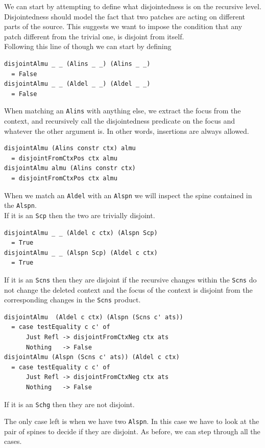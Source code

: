 \documentclass[11pt, titlepage]{article}
\newcommand{\toHaskell}[1]{\texttt{#1}\xspace}
\newcommand{\alins}{\toHaskell{Alins}}
\newcommand{\aldel}{\toHaskell{Aldel}}
\newcommand{\alspn}{\toHaskell{Alspn}}
\newcommand{\scp}{\toHaskell{Scp}}
\newcommand{\scns}{\toHaskell{Scns}}
\newcommand{\schg}{\toHaskell{Schg}}
\begin{document}
We can start by attempting to define what disjointedness is on the recursive 
level.  Disjointedness should model the fact that two patches are acting on different parts of the source. This suggests we want to impose the condition that any patch different from the trivial one, is disjoint from itself.  
\\
Following this line of though we can start by defining

\begin{verbatim}
disjointAlmu _ _ (Alins _ _) (Alins _ _) 
  = False
disjointAlmu _ _ (Aldel _ _) (Aldel _ _)
  = False
\end{verbatim}

When matching an \alins with anything else, we extract the focus from the context, and recursively call the disjointedness predicate on the focus and whatever the other argument is. In other words, insertions are always allowed.

\begin{verbatim}
disjointAlmu (Alins constr ctx) almu
  = disjointFromCtxPos ctx almu
disjointAlmu almu (Alins constr ctx)
  = disjointFromCtxPos ctx almu
\end{verbatim}

When we match an \aldel with an \alspn we will inspect the spine contained in the \alspn.
\\
If it is an \scp then the two are trivially disjoint.

\begin{verbatim}
disjointAlmu _ _ (Aldel c ctx) (Alspn Scp)
  = True
disjointAlmu _ _ (Alspn Scp) (Aldel c ctx)
  = True
\end{verbatim}

If it is an \scns then they are disjoint if the recursive changes within the \scns do not change the deleted context and the focus of the context is disjoint from the corresponding changes in the \scns product.

\begin{verbatim}
disjointAlmu  (Aldel c ctx) (Alspn (Scns c' ats))
  = case testEquality c c' of
      Just Refl -> disjointFromCtxNeg ctx ats
      Nothing   -> False
disjointAlmu (Alspn (Scns c' ats)) (Aldel c ctx)
  = case testEquality c c' of
      Just Refl -> disjointFromCtxNeg ctx ats
      Nothing   -> False
\end{verbatim}

If it is an \schg then they are not disjoint.

The only case left is when we have two \alspn. In this case we have to look at 
the pair of spines to decide if they are disjoint. 
As before, we can step through all the cases.
\end{document}
